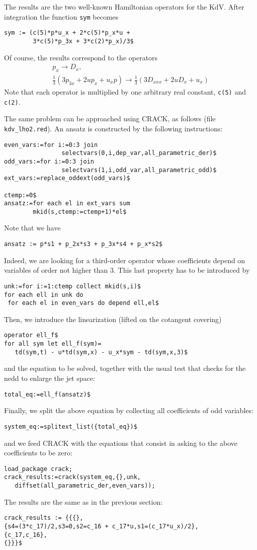 The results are the two well-known Hamiltonian operators for the KdV. 
After integration the function \texttt{sym} becomes
\begin{verbatim}
sym := (c(5)*p*u_x + 2*c(5)*p_x*u +
        3*c(5)*p_3x + 3*c(2)*p_x)/3$
\end{verbatim}
Of course, the results correspond to the operators
\begin{gather*}
  p_x \to D_x,\\
  \frac{1}{3}(3p_{3x} + 2up_x + u_xp) \to \frac{1}{3}(3D_{xxx} + 2uD_{x} + u_x)
\end{gather*}
Note that each operator is multiplied by one arbitrary real
constant, \texttt{c(5)} and \texttt{c(2)}.

The same problem can be approached using CRACK, as follows (file
\texttt{kdv\_lho2.red}). An ansatz is constructed by the following
instructions:
\begin{verbatim}
even_vars:=for i:=0:3 join
                selectvars(0,i,dep_var,all_parametric_der)$
odd_vars:=for i:=0:3 join
                selectvars(1,i,odd_var,all_parametric_odd)$
ext_vars:=replace_oddext(odd_vars)$

ctemp:=0$
ansatz:=for each el in ext_vars sum
        mkid(s,ctemp:=ctemp+1)*el$
\end{verbatim}
Note that we have
\begin{verbatim}
ansatz := p*s1 + p_2x*s3 + p_3x*s4 + p_x*s2$
\end{verbatim}
Indeed, we are looking for a third-order operator whose coefficients depend on
variables of order not higher than $3$. This last property has to be introduced
by
\begin{verbatim}
unk:=for i:=1:ctemp collect mkid(s,i)$
for each ell in unk do
 for each el in even_vars do depend ell,el$
\end{verbatim}
Then, we introduce the linearization (lifted on the cotangent covering)
\begin{verbatim}
operator ell_f$
for all sym let ell_f(sym)=
   td(sym,t) - u*td(sym,x) - u_x*sym - td(sym,x,3)$
\end{verbatim}
and the equation to be solved, together with the usual test that checks for the
nedd to enlarge the jet space:
\begin{verbatim}
total_eq:=ell_f(ansatz)$
\end{verbatim}
Finally, we split the above equation by collecting all coefficients of odd
variables:
\begin{verbatim}
system_eq:=splitext_list({total_eq})$
\end{verbatim}
and we feed CRACK with the equations that consist in asking to the above
coefficients to be zero:
\begin{verbatim}
load_package crack;
crack_results:=crack(system_eq,{},unk,
   diffset(all_parametric_der,even_vars));
\end{verbatim}
The results are the same as in the previous section:
\begin{verbatim}
crack_results := {{{},
{s4=(3*c_17)/2,s3=0,s2=c_16 + c_17*u,s1=(c_17*u_x)/2},
{c_17,c_16},
{}}}$
\end{verbatim}


